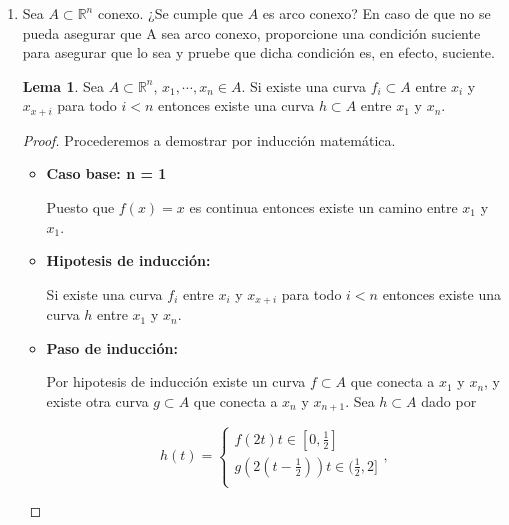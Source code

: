 \documentclass[letterpaper]{article}
\theoremstyle{definition}
\theoremstyle{lemathm}
\newtheorem{lema}{Lema}
\theoremstyle{lemathm}
\theoremstyle{lemathm}
\theoremstyle{lemademthm}
\newcommand{\limtoinf}[1]{\lim_{#1\to\infty}}
\newcommand{\pars}[1]{\left( #1 \right) }
\newcommand{\bracs}[1]{\left[ #1 \right] }
\newcommand{\set}[1]{\left \{ #1 \right\} }
\newcommand{\RR}{\mathbb{R}}
\newcommand{\1}{\mathbbm{1}}
\begin{document}
\begin{enumerate}
\begin{proof}
			puesto que a lo más un elemento de $\set{y_{n_m}}_{m=1}^{\infty}$ era igual a $y$ entonces 
			
			\[\limtoinf{l} y_{n_{m_l}} = y \in A\] 
			
			por lo que $y\in B'$.  $A$ es semicompacto. 
			
			Por lo tanto $A$ es semicompacto si y sólo si es secuencialmente compacto. Puesto que si $A$ es semicompacto si y sólo si es compacto conlcuimos que $A$ es semicompacto si y sólo si es compacto.
		\end{proof}
		
		\item Sea $A\subset\RR^n$ conexo. ¿Se cumple que $A$ es arco conexo? En caso de que no se pueda asegurar que A sea arco conexo, proporcione una condición suciente para asegurar que lo sea y pruebe que dicha condición es, en efecto, suciente.
		
		\begin{lema}
			Sea $A\subset\RR^n$, $x_1,\cdots,x_n\in A$. Si existe una curva $f_i\subset A$ entre $x_{i}$ y $x_{x+i}$ para todo $i < n$ entonces existe una curva $h\subset A$ entre $x_1$  y $x_n$.
		\end{lema}

		\begin{proof}
			Procederemos a demostrar por inducción matemática.

			\begin{itemize}
				\item \textbf{Caso base: n = 1}

				Puesto que $f(x) = x$ es continua entonces existe un camino entre $x_1$ y $x_1$.

				\item \textbf{Hipotesis de inducción:}
				
				Si existe una curva $f_i$ entre $x_{i}$ y $x_{x+i}$ para todo $i < n$ entonces existe una curva $h$ entre $x_1$  y $x_n$.

				\item \textbf{Paso de inducción:}
				
				Por hipotesis de inducción existe un curva $f\subset A$ que conecta a $x_1$ y $x_n$, y existe otra curva $g\subset A$ que conecta a $x_n$ y $x_{n+1}$. Sea $h\subset A$ dado por

				\[h(t) = \begin{cases}
					f\pars{2t} t\in\bracs{0,\frac{1}{2}}\\
					g\pars{2\pars{t-\frac{1}{2}}} t\in(\frac{1}{2},2]\\
				\end{cases},\]


\end{itemize}
\end{proof}
\end{enumerate}
\end{document}
